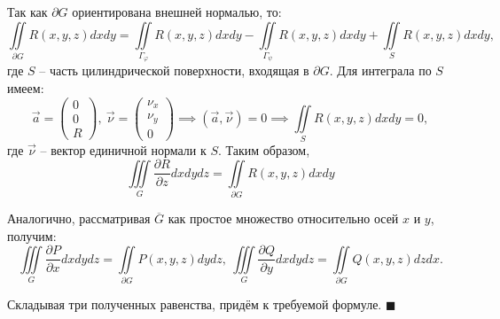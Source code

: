 \documentclass[12pt, a4paper, reqno]{article}
\begin{document}
    Так как $\partial G$ ориентирована внешней нормалью, то:
    \begin{equation*}
        \iint\limits_{\partial G} R(x, y, z) dx dy =
        \iint\limits_{\Gamma_{\varphi}} R(x, y, z) dx dy -
        \iint\limits_{\Gamma_{\psi}} R(x, y, z) dx dy +
        \iint\limits_{S} R(x, y, z) dx dy,
    \end{equation*}
    где $S$ -- часть цилиндрической поверхности, входящая в $\partial G$. Для интеграла по $S$
    имеем:
    \begin{equation*}
        \vec{a} = \begin{pmatrix}
            0 \\ 0 \\ R
        \end{pmatrix}, \
        \vec{\nu} = \begin{pmatrix}
            \nu_x \\ \nu_y \\ 0
        \end{pmatrix} \implies
        (\vec{a}, \vec{\nu}) = 0 \implies \iint\limits_{S} R(x, y, z) dx dy = 0,
    \end{equation*}
    где $\vec{\nu}$ -- вектор единичной нормали к $S$. Таким образом,
    \begin{equation*}
        \iiint\limits_{G}\frac{\partial R}{\partial z} dx dy dz =
        \iint\limits_{\partial G} R(x, y, z) dx dy
    \end{equation*}

    Аналогично, рассматривая $\overline{G}$ как простое множество относительно осей $x$ и $y$,
    получим:
    \begin{equation*}
        \iiint\limits_{G}\frac{\partial P}{\partial x} dx dy dz =
        \iint\limits_{\partial G} P(x, y, z) dy dz,\
        \iiint\limits_{G}\frac{\partial Q}{\partial y} dx dy dz =
        \iint\limits_{\partial G} Q(x, y, z) dz dx.
    \end{equation*}

    Складывая три полученных равенства, придём к требуемой формуле.
    $\blacksquare$
\end{document}
